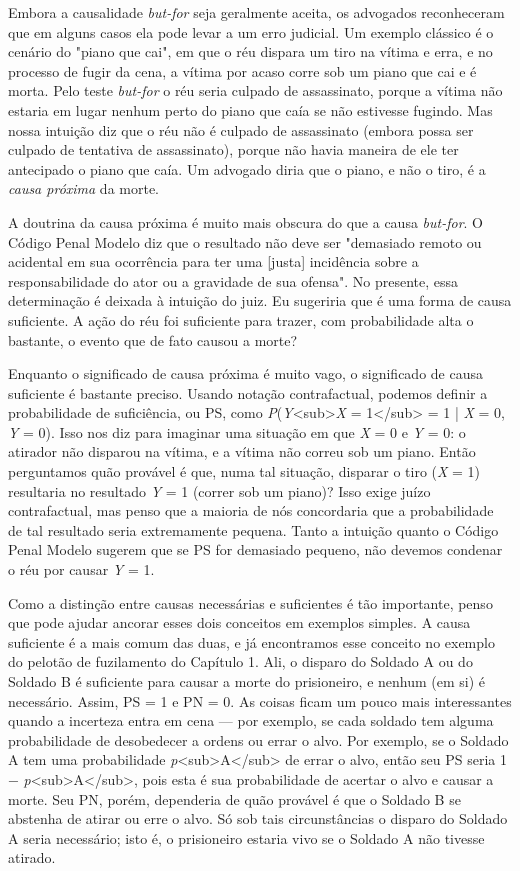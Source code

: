\documentclass[11pt,a5paper,twoside]{book}
\begin{document}
Embora a causalidade \textit{but-for} seja geralmente aceita, os advogados reconheceram que em alguns casos ela pode levar a um erro judicial. Um exemplo clássico é o cenário do "piano que cai", em que o réu dispara um tiro na vítima e erra, e no processo de fugir da cena, a vítima por acaso corre sob um piano que cai e é morta. Pelo teste \textit{but-for} o réu seria culpado de assassinato, porque a vítima não estaria em lugar nenhum perto do piano que caía se não estivesse fugindo. Mas nossa intuição diz que o réu não é culpado de assassinato (embora possa ser culpado de tentativa de assassinato), porque não havia maneira de ele ter antecipado o piano que caía. Um advogado diria que o piano, e não o tiro, é a \textit{causa próxima} da morte.

A doutrina da causa próxima é muito mais obscura do que a causa \textit{but-for}. O Código Penal Modelo diz que o resultado não deve ser "demasiado remoto ou acidental em sua ocorrência para ter uma [justa] incidência sobre a responsabilidade do ator ou a gravidade de sua ofensa". No presente, essa determinação é deixada à intuição do juiz. Eu sugeriria que é uma forma de causa suficiente. A ação do réu foi suficiente para trazer, com probabilidade alta o bastante, o evento que de fato causou a morte?

Enquanto o significado de causa próxima é muito vago, o significado de causa suficiente é bastante preciso. Usando notação contrafactual, podemos definir a probabilidade de suficiência, ou PS, como \textit{P}(\textit{Y}<sub>\textit{X} = 1</sub> = 1 | \textit{X} = 0, \textit{Y} = 0). Isso nos diz para imaginar uma situação em que \textit{X} = 0 e \textit{Y} = 0: o atirador não disparou na vítima, e a vítima não correu sob um piano. Então perguntamos quão provável é que, numa tal situação, disparar o tiro (\textit{X} = 1) resultaria no resultado \textit{Y} = 1 (correr sob um piano)? Isso exige juízo contrafactual, mas penso que a maioria de nós concordaria que a probabilidade de tal resultado seria extremamente pequena. Tanto a intuição quanto o Código Penal Modelo sugerem que se PS for demasiado pequeno, não devemos condenar o réu por causar \textit{Y} = 1.

Como a distinção entre causas necessárias e suficientes é tão importante, penso que pode ajudar ancorar esses dois conceitos em exemplos simples. A causa suficiente é a mais comum das duas, e já encontramos esse conceito no exemplo do pelotão de fuzilamento do Capítulo 1. Ali, o disparo do Soldado A ou do Soldado B é suficiente para causar a morte do prisioneiro, e nenhum (em si) é necessário. Assim, PS = 1 e PN = 0. As coisas ficam um pouco mais interessantes quando a incerteza entra em cena — por exemplo, se cada soldado tem alguma probabilidade de desobedecer a ordens ou errar o alvo. Por exemplo, se o Soldado A tem uma probabilidade \textit{p}<sub>A</sub> de errar o alvo, então seu PS seria 1 − \textit{p}<sub>A</sub>, pois esta é sua probabilidade de acertar o alvo e causar a morte. Seu PN, porém, dependeria de quão provável é que o Soldado B se abstenha de atirar ou erre o alvo. Só sob tais circunstâncias o disparo do Soldado A seria necessário; isto é, o prisioneiro estaria vivo se o Soldado A não tivesse atirado.
\end{document}
